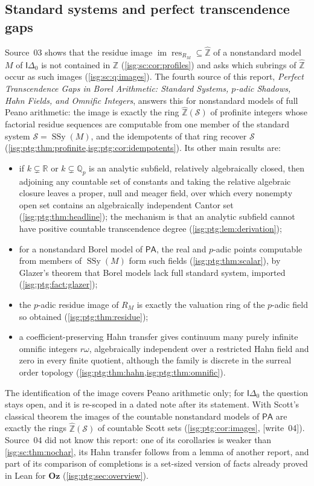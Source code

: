 \documentclass[11pt]{article}
\theoremstyle{definition}
\theoremstyle{remark}
\newcommand{\Oz}{\ensuremath{\mathbf{Oz}}}
\newcommand{\R}{\mathbb{R}}
\newcommand{\Z}{\mathbb{Z}}
\newcommand{\Zhat}{\widehat{\Z}}
\newcommand{\res}{\operatorname{res}}
\newcommand{\Idelta}{\mathsf{I}\Delta_0}
\newcommand{\im}{\operatorname{im}}
\newcommand{\Qp}{\mathbb{Q}_p}
\newcommand{\PA}{\mathsf{PA}}
\newcommand{\SSy}{\operatorname{SSy}}
\begin{document}
\subsection{Standard systems and perfect transcendence gaps}\label{isg:ptg:sec:intro}
Source~03 shows that the residue image $\im\res_{R_M}\subseteq\Zhat$ of a
nonstandard model $M$ of $\Idelta$ is not contained in $\Z$
(\cref{isg:sc:cor:profiles}) and asks which subrings of $\Zhat$ occur as
such images (\cref{isg:sc:q:images}). The fourth source of this report,
\emph{Perfect Transcendence Gaps in Borel Arithmetic: Standard Systems,
$p$-adic Shadows, Hahn Fields, and Omnific Integers}, answers this for
nonstandard models of full Peano arithmetic: the image is exactly the ring
$\Zhat(\mathcal S)$ of profinite integers whose factorial residue
sequences are computable from one member of the standard system
$\mathcal S=\SSy(M)$, and the idempotents of that ring recover
$\mathcal S$ (\cref{isg:ptg:thm:profinite,isg:ptg:cor:idempotents}). Its
other main results are:
\begin{itemize}[leftmargin=*,itemsep=2pt]
\item if $k\subsetneq\R$ or $k\subsetneq\Qp$ is an analytic subfield,
      relatively algebraically closed, then adjoining any countable set of
      constants and taking the relative algebraic closure leaves a proper,
      null and meager field, over which every nonempty open set contains
      an algebraically independent Cantor set
      (\cref{isg:ptg:thm:headline}); the mechanism is that an analytic
      subfield cannot have positive countable transcendence degree
      (\cref{isg:ptg:lem:derivation});
\item for a nonstandard Borel model of $\PA$, the real and $p$-adic
      points computable from members of $\SSy(M)$ form such fields
      (\cref{isg:ptg:thm:scalar}), by Glazer's theorem that Borel models
      lack full standard system, imported (\cref{isg:ptg:fact:glazer});
\item the $p$-adic residue image of $R_M$ is exactly the valuation ring of
      the $p$-adic field so obtained (\cref{isg:ptg:thm:residue});
\item a coefficient-preserving Hahn transfer gives continuum many purely
      infinite omnific integers $r\omega$, algebraically independent over a
      restricted Hahn field and zero in every finite quotient, although the
      family is discrete in the surreal order topology
      (\cref{isg:ptg:thm:hahn,isg:ptg:thm:omnific}).
\end{itemize}
The identification of the image covers Peano arithmetic only; for
$\Idelta$ the question stays open, and it is re-scoped in a dated note after
its statement. With Scott's classical theorem the images of the countable
nonstandard models of $\PA$ are exactly the rings $\Zhat(\mathcal S)$ of
countable Scott sets (\cref{isg:ptg:cor:images}, \textup{[write~04]}).
Source~04 did not know this report: one of its corollaries is weaker than
\cref{isg:sc:thm:nochar}, its Hahn transfer follows from a lemma of another
report, and part of its comparison of completions is a set-sized version of
facts already proved in Lean for $\Oz$ (\cref{isg:ptg:sec:overview}).
\end{document}
